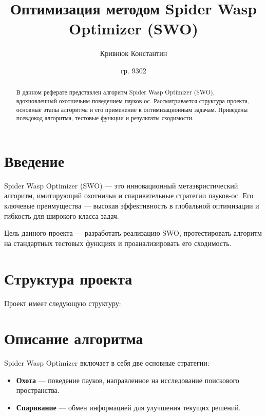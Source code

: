 \documentclass[a4paper,12pt]{article}
\title{\textbf{Оптимизация методом Spider Wasp Optimizer (SWO)}}
\author{Кривнюк Константин}
\date{гр. 9302}
\begin{document}
\maketitle

\begin{abstract}
В данном реферате представлен алгоритм Spider Wasp Optimizer (SWO), вдохновленный охотничьим поведением пауков-ос. Рассматривается структура проекта, основные этапы алгоритма и его применение к оптимизационным задачам. Приведены псевдокод алгоритма, тестовые функции и результаты сходимости.
\end{abstract}

\tableofcontents

\newpage

\section{Введение}
Spider Wasp Optimizer (SWO) — это инновационный метаэвристический алгоритм, имитирующий охотничьи и спаривательные стратегии пауков-ос. Его ключевые преимущества — высокая эффективность в глобальной оптимизации и гибкость для широкого класса задач.

Цель данного проекта — разработать реализацию SWO, протестировать алгоритм на стандартных тестовых функциях и проанализировать его сходимость.

\newpage

\section{Структура проекта}
Проект имеет следующую структуру:


\newpage

\section{Описание алгоритма}
Spider Wasp Optimizer включает в себя две основные стратегии:
\begin{itemize}
    \item \textbf{Охота} — поведение пауков, направленное на исследование поискового пространства.
    \item \textbf{Спаривание} — обмен информацией для улучшения текущих решений.
\end{itemize}
\end{document}
